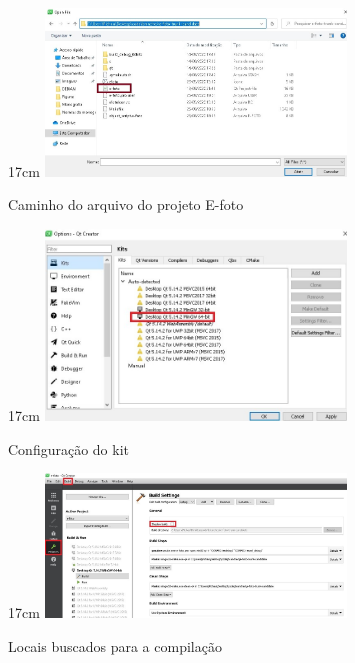  \begin{figure}[!ht]{17cm}
 	\centering
	\includegraphics[width=8cm]{Figuras/openpro.jpg}
	\caption{Caminho do arquivo do projeto E-foto} \label{fig:openpro}
\end{figure}

 \begin{figure}[!ht]{17cm}
 	\centering
	\includegraphics[width=8cm]{Figuras/qtkit.jpg}
	\caption{Configuração do kit} \label{fig:qtkit}
\end{figure}

 \begin{figure}[!ht]{17cm}
 	\centering
	\includegraphics[width=8cm]{Figuras/projectbuild.jpg}
	\caption{Locais buscados para a compilação} \label{fig:projectbuild}
\end{figure}
 